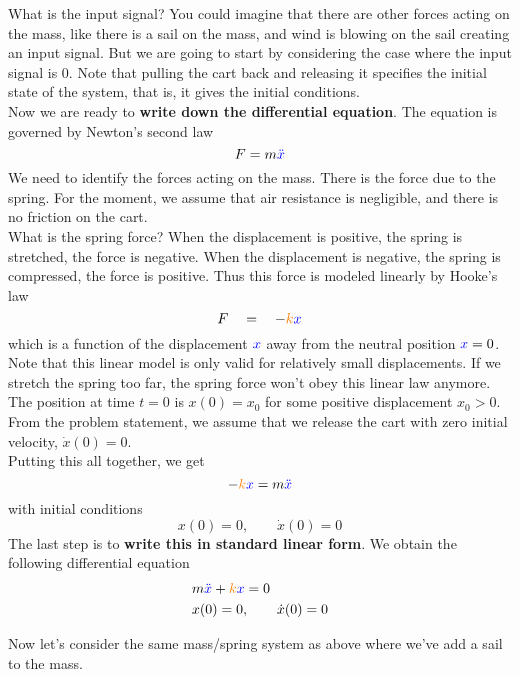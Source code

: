 What is the input signal?
You could imagine that there are other forces acting on the mass, like there is a sail on the mass,
and wind is blowing on the sail creating an input signal.
But we are going to start by considering the case where the input signal is $0$.
Note that pulling the cart back and releasing it specifies the initial state of the system,
that is, it gives the initial conditions.\\

Now we are ready to \textbf{\color{blue} write down the differential equation}.
The equation is governed by Newton's second law
\begin{equation*}
  \displaystyle F = m {\color{blue} \ddot{x}}
\end{equation*}
We need to identify the forces acting on the mass.
There is the force due to the spring.
For the moment, we assume that air resistance is negligible, and there is no friction on the cart.\\

What is the spring force?
When the displacement is positive, the spring is stretched, the force is negative.
When the displacement is negative, the spring is compressed, the force is positive.
Thus this force is modeled linearly by Hooke's law
\begin{equation*}
  \displaystyle F \quad = \quad -{\color{orange}k} {\color{blue}x}
\end{equation*}
which is a function of the displacement ${\color{blue} x}$ away from the neutral position ${\color{blue} x} = 0$.
Note that this linear model is only valid for relatively small displacements.
If we stretch the spring too far, the spring force won't obey this linear law anymore.\\

The position at time $t = 0$ is $x(0) = x_0$ for some positive displacement $x_0 > 0$.
From the problem statement, we assume that we release the cart with zero initial velocity, $\dot{x}(0) = 0$.\\

Putting this all together, we get
\begin{equation*}
  \displaystyle -{\color{orange}k} {\color{blue}x} = m {\color{blue} \ddot{x}}
\end{equation*}
with initial conditions
\begin{equation*}
  x(0) = 0, \qquad \dot{x}(0) = 0
\end{equation*}
The last step is to \textbf{write this in standard linear form}.
We obtain the following differential equation
\begin{align*}
  &\displaystyle m {\color{blue} \ddot{x}} + {\color{orange}k} {\color{blue}x} = 0\\
  &\displaystyle x(0) = 0, \qquad \dot{x}(0) = 0
\end{align*}
\begin{example}
  Now let's consider the same mass/spring system as above where we've add a sail to the mass.
\end{example}

